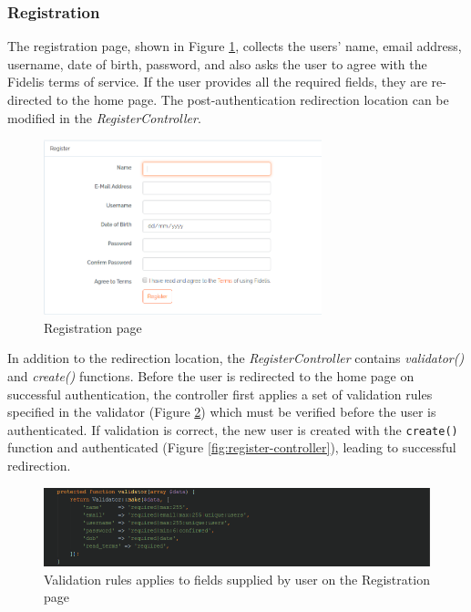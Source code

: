 \subsubsection{Registration}
The registration page, shown in Figure \ref{fig:RegisterPage}, collects the users' name, email address, username, date of birth, password, and also asks the user to agree with the Fidelis terms of service. If the user provides all the required fields, they are re-directed to the home page. The post-authentication redirection location can be modified in the \textit{RegisterController}.

\begin{figure}[H]
\centering
\includegraphics[height=2in]{Images/Design/register-page}
\caption{Registration page}
\label{fig:RegisterPage}
\end{figure}

In addition to the redirection location, the \textit{RegisterController} contains \textit{validator()} and \textit{create()} functions. Before the user is redirected to the home page on successful authentication, the controller first applies a set of validation rules specified in the validator (Figure \ref{fig:RegValidation}) which must be verified before the user is authenticated. If validation is correct, the new user is created with the \texttt{create()} function and authenticated (Figure \ref{fig:register-controller}), leading to successful redirection.

\begin{figure}[H]
\centering
\includegraphics[width=\textwidth]{Images/Implementation/RegisterValidation}
\caption{Validation rules applies to fields supplied by user on the Registration page}
\label{fig:RegValidation}
\end{figure}

